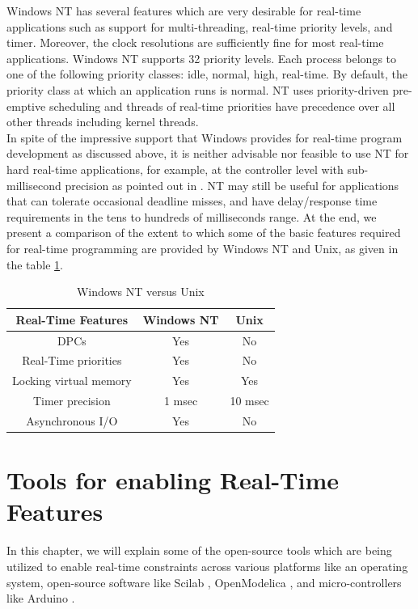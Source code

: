 \documentclass[12pt]{report}
\begin{document}
Windows NT has several features which are very desirable for real-time applications such as support for multi-threading, real-time priority levels, and timer. Moreover, the clock resolutions are sufficiently fine for most real-time applications. Windows NT supports 32 priority levels. Each process belongs to one of the following priority classes: idle, normal, high, real-time. By default, the priority class at which an application runs is normal. NT uses priority-driven pre-emptive scheduling and threads of real-time priorities have precedence over all other threads including kernel threads. \\

In spite of the impressive support that Windows provides for real-time program development as discussed above, it is neither advisable nor feasible to use NT for hard real-time applications, for example, at the controller level with sub-millisecond precision as pointed  out in \cite{windowsnt-k}. NT may still be useful for applications that can tolerate occasional deadline misses, and have delay/response time requirements in the tens to hundreds of milliseconds range. At the end, we present a comparison of the extent to which some of the basic features required for real-time programming are provided by Windows NT and Unix, as given in the table \ref{table:4}. 
\begin{table}[h]
\centering
\begin{tabular}{|c|c|c|}
 \hline
 \textbf{Real-Time Features} &  \textbf{Windows NT} & \textbf{Unix}\\
 \hline \hline
 DPCs & Yes & No \\
 \hline
 Real-Time priorities & Yes & No \\
 \hline
 Locking virtual memory & Yes & Yes\\
 \hline 
 Timer precision & 1 msec & 10 msec \\
 \hline
 Asynchronous I/O & Yes & No\\
 \hline
\end{tabular}
\caption{Windows NT versus Unix}
\label{table:4}
\end{table}



\chapter{Tools for enabling Real-Time Features}
In this chapter, we will explain some of the open-source tools which are being utilized to enable real-time constraints across various platforms like an operating system, open-source software like Scilab \cite{scilab}, OpenModelica \cite{OM},  and micro-controllers like Arduino \cite{arduino}. \\
\end{document}
